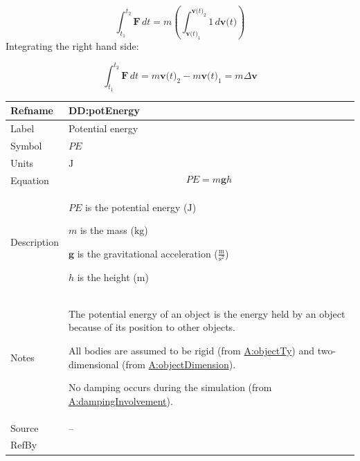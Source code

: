 \documentclass[12pt]{article}
\begin{document}
\begin{displaymath}
\int_{{t_{1}}}^{{t_{2}}}{\symbf{F}}\,dt=m \left(\int_{{\symbf{v}\text{(}t\text{)}_{1}}}^{{\symbf{v}\text{(}t\text{)}_{2}}}{1}\,d\symbf{v}\text{(}t\text{)}\right)
\end{displaymath}
Integrating the right hand side:

\begin{displaymath}
\int_{{t_{1}}}^{{t_{2}}}{\symbf{F}}\,dt=m {\symbf{v}\text{(}t\text{)}_{2}}-m {\symbf{v}\text{(}t\text{)}_{1}}=m Δ\symbf{v}
\end{displaymath}
\medskip
\noindent
\begin{minipage}{\textwidth}
\begin{tabular}{>{\raggedright}p{}>{\raggedright\arraybackslash}p{}}
\toprule \textbf{Refname} & \textbf{DD:potEnergy}
\label{DD:potEnergy}
\\ \midrule
Label & Potential energy
        
\\ \midrule
Symbol & $PE$
         
\\ \midrule
Units & ${\text{J}}$
        
\\ \midrule
Equation & \begin{displaymath}
           PE=m \symbf{g} h
           \end{displaymath}
\\ \midrule
Description & \begin{symbDescription}
              \item{$PE$ is the potential energy (${\text{J}}$)}
              \item{$m$ is the mass (${\text{kg}}$)}
              \item{$\symbf{g}$ is the gravitational acceleration ($\frac{\text{m}}{\text{s}^{2}}$)}
              \item{$h$ is the height (${\text{m}}$)}
              \end{symbDescription}
\\ \midrule
Notes & The potential energy of an object is the energy held by an object because of its position to other objects.
        
        All bodies are assumed to be rigid (from \hyperref[assumpOT]{A:objectTy}) and two-dimensional (from \hyperref[assumpOD]{A:objectDimension}).
        
        No damping occurs during the simulation (from \hyperref[assumpDI]{A:dampingInvolvement}).
        
\\ \midrule
Source & --
         
\\ \midrule
RefBy & 
\\ \bottomrule
\end{tabular}
\end{minipage}
\end{document}
